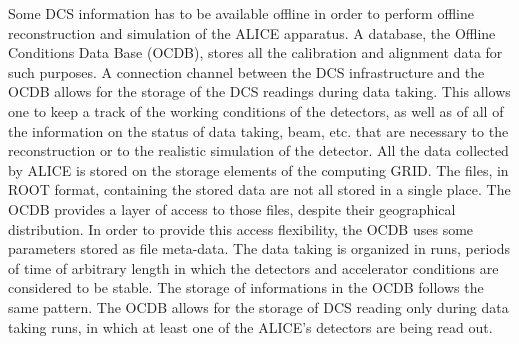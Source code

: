 Some DCS information has to be available offline in order to perform offline reconstruction and simulation of the ALICE apparatus.
A database, the Offline Conditions Data Base (OCDB), stores all the calibration and alignment data for such purposes.
A connection channel between the DCS infrastructure and the OCDB allows for the storage of the DCS readings during data taking.
This allows one to keep a track of the working conditions of the detectors, as well as of all of the information on the status of data taking, beam, etc. that are necessary to the reconstruction or to the realistic simulation of the detector.
All the data collected by ALICE is stored on the storage elements of the computing GRID.
The files, in ROOT format, containing the stored data are not all stored in a single place.
The OCDB provides a layer of access to those files, despite their geographical distribution.
In order to provide this access flexibility, the OCDB uses some parameters stored as file meta-data.
The data taking is organized in runs, periods of time of arbitrary length in which the detectors and accelerator conditions are considered to be stable.
The storage of informations in the OCDB follows the same pattern.
The OCDB allows for the storage of DCS reading only during data taking runs, in which at least one of the ALICE's detectors are being read out.


